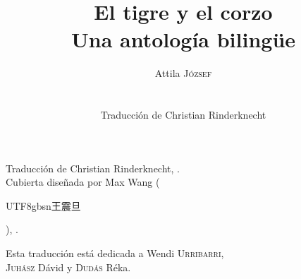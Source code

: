 \documentclass[11pt]{book}
\title{El tigre y el corzo\\ {\large Una antología bilingüe}}
\author{{\Large Attila \textsc{József}}\\\\\\
Traducción de Christian Rinderknecht}
\date{\oldstylenums{2026}}
\newcommand*{\centeredornament}{\centerline{\pgfornament[width=6cm]{88}}}
\newcommand{\zh}[1]{\begin{CJK}{UTF8}{gbsn}#1\end{CJK}}
\begin{document}


\thispagestyle{empty}

\mbox{}
\thispagestyle{empty}

\newpage\leavevmode\thispagestyle{empty}

\mbox{}
\thispagestyle{empty}

\maketitle

\thispagestyle{empty}

\vspace*{\fill}

\begin{flushright}
  \textcopyright{} Traducción de Christian Rinderknecht,
  .\\
  \textcopyright{} Cubierta diseñada por Max Wang (\zh{王震旦}), .
\end{flushright}

\newpage

\vspace*{4cm}

\begin{flushright}
  Esta traducción está dedicada a Wendi \textsc{Urribarri}, \\
  \textsc{Juhász} Dávid y \textsc{Dudás} Réka.
\end{flushright}

\thispagestyle{empty}

\newpage\leavevmode\thispagestyle{empty}\newpage

\thispagestyle{empty}

\def\contentsname{\empty}
\tableofcontents

\thispagestyle{empty}
\newpage
\leavevmode\thispagestyle{empty}
\newpage
\clearpage


\vspace*{-15mm}
\centeredornament



\end{document}
